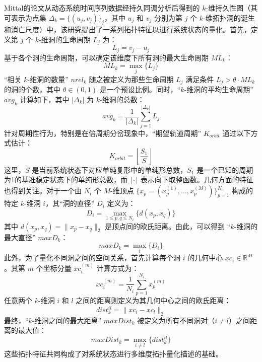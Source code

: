 Mittal的论文\cite{mittal2017topological}从动态系统时间序列数据经持久同调分析后得到的 $k$-维持久性图（其可表示为点集 $\Delta_k = \{(u_j, v_j)\}_j$，其中 $u_j$ 和 $v_j$ 分别为第 $j$ 个 $k$-维拓扑洞的诞生和消亡尺度）中，该研究提出了一系列拓扑特征以进行系统状态的量化。首先，定义第 $j$ 个 $k$-维洞的生命周期 $L_j$ 为：
\begin{equation}
    L_j = v_j - u_j
\end{equation}
基于各个洞的生命周期，可以确定该维度下所有洞的最大生命周期 $ML_k$：
\begin{equation}
    ML_k = \max_{j} \{L_j\}
\end{equation}
“相关 $k$-维洞的数量” $nrel_k$ 随之被定义为那些生命周期 $L_j$ 满足条件 $L_j > \theta \cdot ML_k$ 的洞的个数，其中 $\theta \in (0,1)$ 是一个预设比例。同时，“$k$-维洞的平均生命周期” $avg_k$ 计算如下，其中 $|\Delta_k|$ 为 $k$-维洞的总数：
\begin{equation}
    avg_k = \frac{1}{|\Delta_k|} \sum_{j=1}^{|\Delta_k|} L_j
\end{equation}
针对周期性行为，特别是在倍周期分岔现象中，“期望轨道周期” $K_{orbit}$ 通过以下方式估计：
\begin{equation}
    K_{orbit} = \left\lfloor \frac{S_1}{S} \right\rfloor
\end{equation}
这里，$S$ 是当前系统状态下对应单纯复形中的单纯形总数，$S_1$ 是一个已知的周期为1的基准稳定状态下的单纯形总数，而 $\lfloor \cdot \rfloor$ 表示向下取整函数。几何方面的特征也得到关注。对于一个由 $N_i$ 个 $M$-维顶点 $\{x_p = (x_p^{(1)}, \ldots, x_p^{(M)})\}_{p=1}^{N_i}$ 构成的特定 $k$-维洞 $i$，其“洞的直径” $D_i$ 定义为：
\begin{equation}
    D_i = \max_{1 \le p, q \le N_i} \{ d(x_p, x_q) \}
\end{equation}
其中 $d(x_p, x_q) = \|x_p - x_q\|_2$ 是顶点间的欧氏距离。由此，可以得到 “$k$-维洞的最大直径” $maxD_k$：
\begin{equation}
    maxD_k = \max_{i} \{D_i\}
\end{equation}
此外，为了量化不同洞之间的空间关系，首先计算每个洞 $i$ 的几何中心 $xc_i \in \mathbb{R}^M$。其第 $m$ 个坐标分量 $xc_i^{(m)}$ 计算方式为：
\begin{equation}
    xc_i^{(m)} = \frac{1}{N_i} \sum_{p=1}^{N_i} x_p^{(m)}
\end{equation}
任意两个 $k$-维洞 $i$ 和 $l$ 之间的距离则定义为其几何中心之间的欧氏距离：
\begin{equation}
    dist_k^{il} = \|xc_i - xc_l\|_2
\end{equation}
最终，“$k$-维洞之间的最大距离” $maxDist_k$ 被定义为所有不同洞对（$i \neq l$）之间距离的最大值：
\begin{equation}
    maxDist_k = \max_{i \neq l} \{dist_k^{il}\}
\end{equation}
这些拓扑特征共同构成了对系统状态进行多维度拓扑量化描述的基础。


